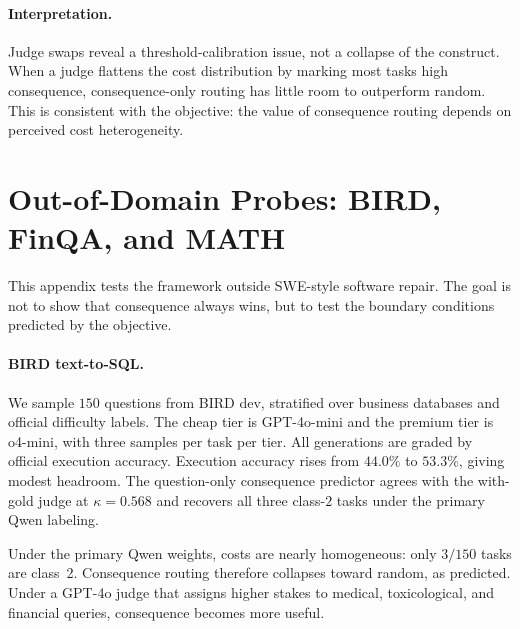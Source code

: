 \documentclass{article}
\begin{document}
\paragraph{Interpretation.}
Judge swaps reveal a threshold-calibration issue, not a collapse of
the construct. When a judge flattens the cost distribution by marking
most tasks high consequence, consequence-only routing has little room
to outperform random. This is consistent with the objective: the value
of consequence routing depends on perceived cost heterogeneity.

\section{Out-of-Domain Probes: BIRD, FinQA, and MATH}
\label{app:ood}

This appendix tests the framework outside SWE-style software repair.
The goal is not to show that consequence always wins, but to test the
boundary conditions predicted by the objective.

\paragraph{BIRD text-to-SQL.}
We sample $150$ questions from BIRD dev, stratified over business
databases and official difficulty labels. The cheap tier is GPT-4o-mini
and the premium tier is o4-mini, with three samples per task per tier.
All generations are graded by official execution accuracy. Execution
accuracy rises from $44.0\%$ to $53.3\%$, giving modest headroom. The
question-only consequence predictor agrees with the with-gold judge at
$\kappa=0.568$ and recovers all three class-$2$ tasks under the primary
Qwen labeling.

Under the primary Qwen weights, costs are nearly homogeneous:
only $3/150$ tasks are class~2. Consequence routing therefore collapses
toward random, as predicted. Under a GPT-4o judge that assigns higher
stakes to medical, toxicological, and financial queries, consequence
becomes more useful.
\end{document}
